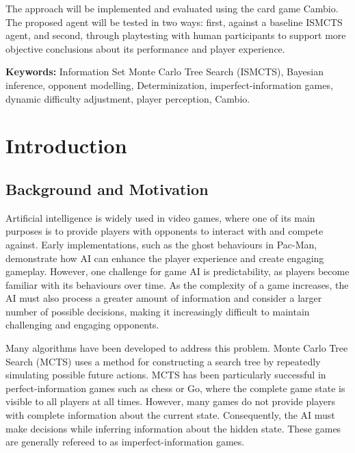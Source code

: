 \documentclass[12pt,a4paper,oneside]{report}
\begin{document}
The approach will be implemented and evaluated using the card game Cambio. The proposed agent will be tested in two ways: first, against a baseline ISMCTS agent, and second, through playtesting with human participants to support more objective conclusions about its performance and player experience.

\vspace{3em}
\noindent\textbf{Keywords:} Information Set Monte Carlo Tree Search (ISMCTS), Bayesian inference, opponent modelling, Determinization, imperfect-information games, dynamic difficulty adjustment, player perception, Cambio.
\tableofcontents


\listoffigures
{}

\listoftables
{}

\clearpage
{}


\chapter{Introduction}
\label{ch:intro}
\section{Background and Motivation}

Artificial intelligence is widely used in video games, where one of its main purposes is to provide players with opponents to interact with and compete against. Early implementations, such as the ghost behaviours in Pac-Man, demonstrate how AI can enhance the player experience and create engaging gameplay. However, one challenge for game AI is predictability, as players become familiar with its behaviours over time. As the complexity of a game increases, the AI must also process a greater amount of information and consider a larger number of possible decisions, making it increasingly difficult to maintain challenging and engaging opponents.

Many algorithms have been developed to address this problem. Monte Carlo Tree Search (MCTS) uses a method for constructing a search tree by repeatedly simulating possible future actions. MCTS has been particularly successful in perfect-information games such as chess or Go, where the complete game state is visible to all players at all times. However, many games do not provide players with complete information about the current state. Consequently, the AI must make decisions while inferring information about the hidden state. These games are generally refereed to as imperfect-information games. 
\end{document}
